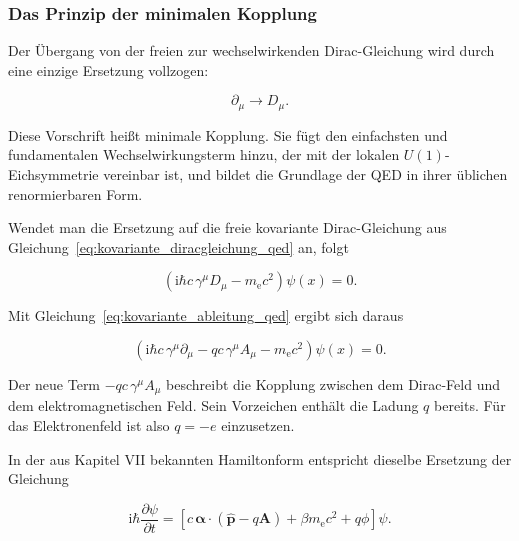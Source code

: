 \subsubsection*{Das Prinzip der minimalen Kopplung}

Der Übergang von der freien zur wechselwirkenden Dirac-Gleichung wird
durch eine einzige Ersetzung vollzogen:

\begin{equation}
	\boxed{
		\partial_\mu
		\longrightarrow
		D_\mu
	}.
	\label{eq:minimale_kopplung_qed}
\end{equation}

Diese Vorschrift heißt minimale Kopplung. Sie
fügt den einfachsten und fundamentalen Wechselwirkungsterm hinzu, der
mit der lokalen \(U(1)\)-Eichsymmetrie vereinbar ist, und bildet die
Grundlage der QED in ihrer üblichen renormierbaren Form.

Wendet man die Ersetzung auf die freie kovariante Dirac-Gleichung aus
Gleichung~\eqref{eq:kovariante_diracgleichung_qed} an, folgt

\begin{equation}
	\left(
	\mathrm{i}\hbar c\,\gamma^\mu D_\mu
	-
	m_{\mathrm e}c^2
	\right)
	\psi(x)
	=
	0.
	\label{eq:diracgleichung_kovariante_ableitung_qed}
\end{equation}

Mit Gleichung~\eqref{eq:kovariante_ableitung_qed} ergibt sich daraus

\begin{equation}
	\left(
	\mathrm{i}\hbar c\,\gamma^\mu\partial_\mu
	-
	qc\,\gamma^\mu A_\mu
	-
	m_{\mathrm e}c^2
	\right)
	\psi(x)
	=
	0.
	\label{eq:diracgleichung_elektromagnetische_kopplung_qed}
\end{equation}

Der neue Term \(-qc\,\gamma^\mu A_\mu\) beschreibt die Kopplung
zwischen dem Dirac-Feld und dem elektromagnetischen Feld. Sein
Vorzeichen enthält die Ladung \(q\) bereits. Für das Elektronenfeld ist
also \(q=-e\) einzusetzen.

In der aus Kapitel VII bekannten Hamiltonform entspricht dieselbe
Ersetzung der Gleichung

\begin{equation}
	\mathrm{i}\hbar
	\frac{\partial\psi}{\partial t}
	=
	\left[
	c\,\boldsymbol{\alpha}\cdot
	\left(
	\hat{\mathbf p}
	-
	q\mathbf A
	\right)
	+
	\beta m_{\mathrm e}c^2
	+
	q\phi
	\right]
	\psi.
	\label{eq:diracgleichung_minimale_kopplung_hamiltonform_qed}
\end{equation}

